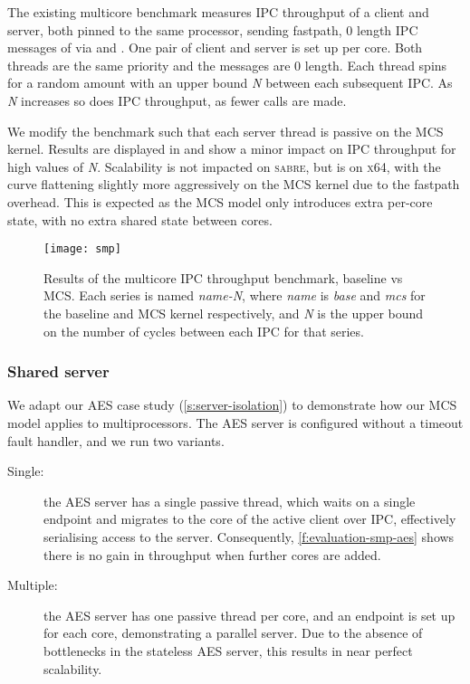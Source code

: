 The existing multicore benchmark measures IPC throughput of a client and server, both 
pinned to the same processor, sending fastpath, 0 length IPC messages of via \call
and \replyrecv. One pair of client and server is set up per core. Both threads are
the same priority and the messages are 0 length. Each thread spins for a random amount
with an upper bound \textit{N} between each subsequent IPC. As \textit{N} increases so does
IPC throughput, as fewer calls are made.

We modify the benchmark such that each server thread is passive on the MCS kernel.
Results are displayed in  and show a minor impact on IPC throughput
for high values of \textit{N}. Scalability is not impacted on \textsc{sabre}, but is on \textsc{x64},
with the curve flattening slightly more aggressively on the MCS kernel
due to the fastpath overhead. This is expected as the MCS model only introduces extra 
per-core state, with no extra shared state between cores.

\begin{figure}[ht] 
    \centering
    \texttt{[image: smp]}
    \caption[Results of the multicore IPC throughput benchmark.]{Results of the multicore IPC throughput benchmark, baseline \selfour vs MCS. 
        Each series is named \textit{name-N}, where \textit{name} is \textit{base} and \textit{mcs} for 
        the baseline and MCS kernel respectively, and \textit{N} is the upper
        bound on the number of cycles between each IPC for that series.}
    \label{f:evaluation-smp}
\end{figure}

\subsubsection{Shared server}

We adapt our \gls{AES} case study (\cref{s:server-isolation}) to demonstrate how our MCS model 
applies to multiprocessors. The AES server is configured without a timeout fault handler, and
we run two variants. 

\begin{description}
    \item[Single:] the AES server has a single passive thread, which waits on a single endpoint
        and migrates to the core of the active client over IPC, effectively serialising access to the server.
        Consequently, \cref{f:evaluation-smp-aes} shows there is no gain in throughput when further cores are
        added. 
    \item[Multiple:] the AES server has one passive thread per core, and an endpoint is set up for
        each core, demonstrating a parallel server. Due to the absence of bottlenecks in the stateless 
        AES server, this results in near perfect scalability.
\end{description}

